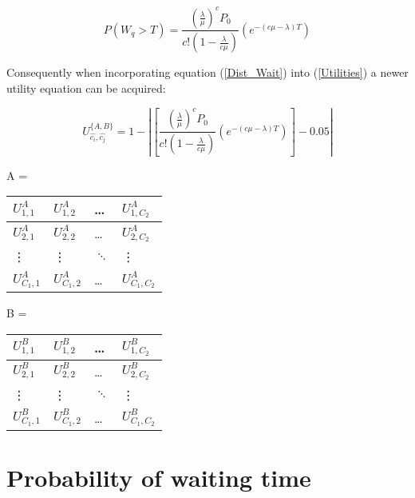 \documentclass{article}
\begin{document}
\begin{equation}\label{Dist_Wait}
    P(W_q > T) = \frac{(\frac{\lambda}{\mu})^c P_0}{c!(1-\frac{\lambda}{c \mu})} (e^{-(c \mu - \lambda)T})
\end{equation}

Consequently when incorporating equation (\ref{Dist_Wait}) into (\ref{Utilities}) a newer utility equation can be acquired:
 
\begin{equation}\label{Utilities2}
    U_{\hat{c_i}, \hat{c_j}} ^ {\{A, B\}} = 1 - \left| \left[ \frac{(\frac{\lambda}{\mu})^c P_0}{c!(1-\frac{\lambda}{c \mu})} \left( e^{-(c \mu - \lambda)T} \right) \right] - 0.05 \right|
\end{equation}

\begin{table}[h]
    \centering
    \begin{minipage}{.5\linewidth}
        A = 
        \begin{tabular}{|l|l|l|l|}
            \hline
            $U_{1,1}^A$ & $U_{1,2}^A$ & \dots & $U_{1,C_2}^A$ \\ \hline
            $U_{2,1}^A$ & $U_{2,2}^A$ & \dots & $U_{2,C_2}^A$ \\ \hline
            \vdots & \vdots & $\ddots$ & \vdots \\ \hline
            $U_{C_1,1}^A$ & $U_{C_1,2}^A$ & \dots & $U_{C_1,C_2}^A$ \\ \hline
        \end{tabular}
    \end{minipage}%
    \begin{minipage}{.5\linewidth}
        B = 
        \begin{tabular}{|l|l|l|l|}
            \hline
            $U_{1,1}^B$ & $U_{1,2}^B$ & \dots & $U_{1,C_2}^B$ \\ \hline
            $U_{2,1}^B$ & $U_{2,2}^B$ & \dots & $U_{2,C_2}^B$ \\ \hline
            \vdots & \vdots & $\ddots$ & \vdots \\ \hline
            $U_{C_1,1}^B$ & $U_{C_1,2}^B$ & \dots & $U_{C_1,C_2}^B$ \\ \hline
        \end{tabular}
    \end{minipage}
\end{table}  


\section{Probability of waiting time}
\end{document}
